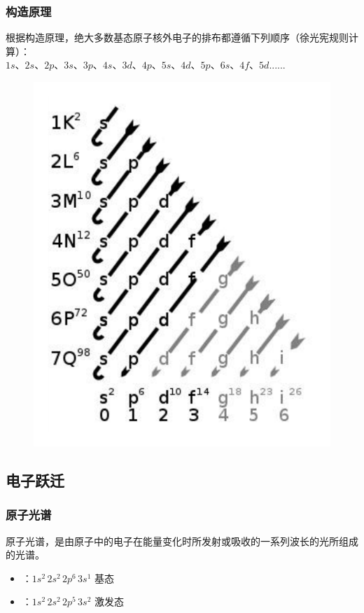 \documentclass[a4paper]{article}
\begin{document}
	\subsubsection{构造原理}
	根据构造原理，绝大多数基态原子核外电子的排布都遵循下列顺序（徐光宪规则计算）：\\
	$1s$、$2s$、$2p$、$3s$、$3p$、$4s$、$3d$、$4p$、$5s$、$4d$、$5p$、$6s$、$4f$、$5d$......
	\begin{figure}[h]
	\centering
	\includegraphics[scale=0.6]{res/Aufbau.pdf}
	\end{figure}
	
	\subsection{电子跃迁}
	\subsubsection{原子光谱}
	原子光谱，是由原子中的电子在能量变化时所发射或吸收的一系列波长的光所组成的光谱。
	\begin{itemize}
		\item {}：$1s^2\,2s^2\,2p^6\,3s^1$ 基态
		\item {}：$1s^2\,2s^2\,2p^5\,3s^2$ 激发态
	\end{itemize}
\end{document}
